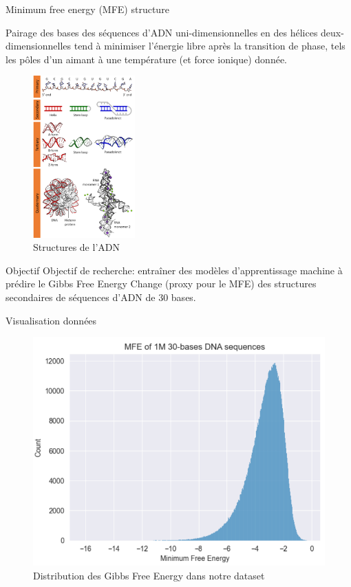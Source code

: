 \documentclass{beamer}
\begin{document}
\begin{frame}{Minimum free energy (MFE) structure}

Pairage des bases des séquences d'ADN uni-dimensionnelles en des hélices deux-dimensionnelles tend à minimiser l'énergie libre après la transition de phase, tels les pôles d'un aimant à une température (et force ionique) donnée.

\begin{figure} \label{fig:ADN_structure}
    \caption{Structures de l'ADN} \center
    \includegraphics[width=0.35\textwidth]{images/DNA_structure.png}
\end{figure}

\end{frame}

\begin{frame}{Objectif}
Objectif de recherche: entraîner des modèles d'apprentissage machine à prédire le Gibbs Free Energy Change (proxy pour le MFE) des structures secondaires de séquences d'ADN de 30 bases.

\end{frame}

\begin{frame}{Visualisation données}

\begin{figure} \label{fig:MFE_nupack}
    \caption{Distribution des Gibbs Free Energy dans notre dataset} \center
    \includegraphics[width=.7\textwidth]{images/MFE_nupack.png}
\end{figure}

\end{frame}
\end{document}
